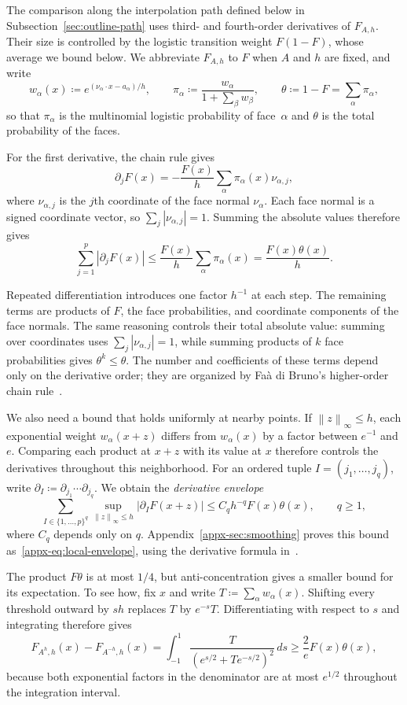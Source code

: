 \documentclass[11pt,letterpaper]{article}
\theoremstyle{remark}
\newcommand{\norm}[1]{\left\lVert#1\right\rVert}
\begin{document}
The comparison along the interpolation path defined below in
Subsection~\ref{sec:outline-path} uses third- and fourth-order
derivatives of \(F_{A,h}\). Their size is controlled by the logistic
transition weight \(F(1-F)\), whose average we bound below. We
abbreviate \(F_{A,h}\) to \(F\) when \(A\) and \(h\) are fixed,
and write
\[
 w_\alpha(x)\coloneqq e^{(\nu_\alpha\cdot x-a_\alpha)/h},\qquad
 \pi_\alpha\coloneqq \frac{w_\alpha}{1+\sum_\beta w_\beta},\qquad
 \theta\coloneqq 1-F=\sum_\alpha\pi_\alpha,
\]
so that \(\pi_\alpha\) is the multinomial logistic probability of
face~\(\alpha\) and \(\theta\) is the total probability of the faces.

For the first derivative, the chain rule gives
\[
 \partial_jF(x)=-\frac{F(x)}h
       \sum_\alpha\pi_\alpha(x)\nu_{\alpha,j},
\]
where \(\nu_{\alpha,j}\) is the \(j\)th coordinate of the face
normal \(\nu_\alpha\). Each face normal is a signed coordinate
vector, so \(\sum_j|\nu_{\alpha,j}|=1\). Summing the absolute
values therefore gives
\[
 \sum_{j=1}^p|\partial_jF(x)|
 \le\frac{F(x)}h\sum_\alpha\pi_\alpha(x)
 =\frac{F(x)\theta(x)}h.
\]

Repeated differentiation introduces one factor \(h^{-1}\) at each
step. The remaining terms are products of \(F\), the face
probabilities, and coordinate components of the face normals. The
same reasoning controls their total absolute value: summing over
coordinates uses \(\sum_j|\nu_{\alpha,j}|=1\), while summing
products of \(k\) face probabilities gives \(\theta^k\le\theta\).
The number and coefficients of these terms depend only on the
derivative order; they are organized by Fa\`a di Bruno's higher-order
chain rule~\cite{Comtet1974}.

We also need a bound that holds uniformly at nearby points. If
\(\norm z_\infty\le h\), each exponential weight
\(w_\alpha(x+z)\) differs from \(w_\alpha(x)\) by a factor
between \(e^{-1}\) and \(e\). Comparing each product at \(x+z\)
with its value at \(x\) therefore controls the derivatives
throughout this neighborhood. For an ordered tuple
\(I=(j_1,\ldots,j_q)\), write
\(\partial_I\coloneqq \partial_{j_1}\cdots\partial_{j_q}\). We obtain the
\emph{derivative envelope}
\[
 \sum_{I\in\{1,\ldots,p\}^q}
 \sup_{\norm z_\infty\le h}|\partial_IF(x+z)|
 \le C_qh^{-q}F(x)\theta(x),\qquad q\ge1,
\]
where \(C_q\) depends only on \(q\).
Appendix~\ref{appx-sec:smoothing} proves this bound
as~\eqref{appx-eq:local-envelope}, using the derivative formula
in~\cite[Lemma~13]{GaoZhang}.

The product \(F\theta\) is at most \(1/4\), but anti-concentration
gives a smaller bound for its expectation. To see how, fix \(x\)
and write \(T\coloneqq \sum_\alpha w_\alpha(x)\). Shifting every threshold
outward by \(s h\) replaces \(T\) by \(e^{-s}T\). Differentiating
with respect to \(s\) and integrating therefore gives
\[
 F_{A^h,h}(x)-F_{A^{-h},h}(x)
 =\int_{-1}^{1}\frac{T}{(e^{s/2}+Te^{-s/2})^2}\,ds
 \ge\frac2e F(x)\theta(x),
\]
because both exponential factors in the denominator are at most
\(e^{1/2}\) throughout the integration interval.
\end{document}
